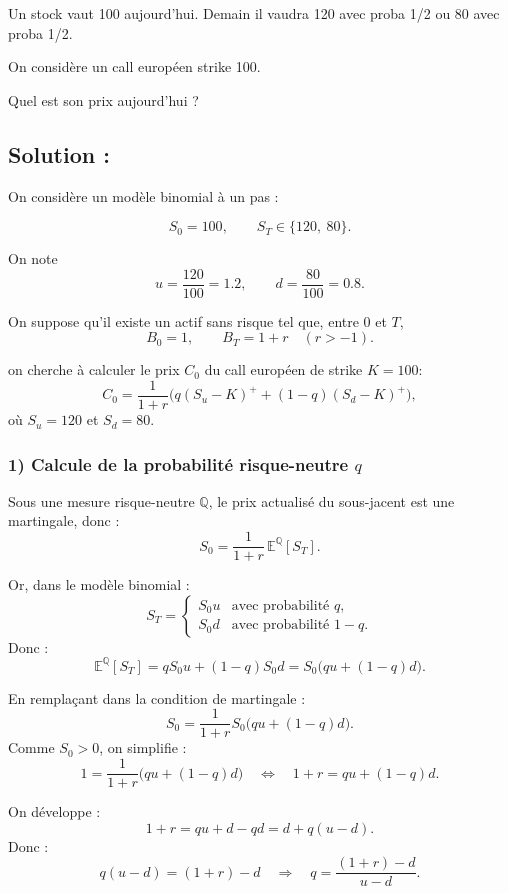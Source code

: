 \begin{exerciseBox}

Un stock vaut 100 aujourd’hui. Demain il vaudra 120 avec proba 1/2 ou 80 avec proba 1/2.

On considère un call européen strike 100.

Quel est son prix aujourd’hui ?
\end{exerciseBox}

\subsection*{Solution :}



On considère un modèle binomial à un pas :

\[
S_0 = 100,\qquad S_T\in\{120,\ 80\}.
\]

On note
\[
u=\frac{120}{100}=1.2,\qquad d=\frac{80}{100}=0.8.
\]

On suppose qu'il existe un actif sans risque tel que, entre $0$ et $T$,
\[
B_0=1,\qquad B_T=1+r \quad (r>-1).
\]


on cherche à calculer le prix $C_0$ du call européen de strike $K=100$:
\[
C_0=\frac{1}{1+r}\Big(q(S_u-K)^+ + (1-q)(S_d-K)^+\Big),
\]
où $S_u=120$ et $S_d=80$.

\subsubsection*{1) Calcule de la probabilité risque-neutre $q$}

Sous une mesure risque-neutre $\mathbb{Q}$, le prix actualisé du sous-jacent est une martingale, donc :
\[
S_0 = \frac{1}{1+r}\,\mathbb{E}^{\mathbb{Q}}[S_T].
\]

Or, dans le modèle binomial :
\[
S_T=
\begin{cases}
S_0u & \text{avec probabilité } q,\\
S_0d & \text{avec probabilité } 1-q.
\end{cases}
\]
Donc :
\[
\mathbb{E}^{\mathbb{Q}}[S_T]=qS_0u+(1-q)S_0d=S_0\big(qu+(1-q)d\big).
\]

En remplaçant dans la condition de martingale :
\[
S_0=\frac{1}{1+r}S_0\big(qu+(1-q)d\big).
\]
Comme $S_0>0$, on simplifie :
\[
1=\frac{1}{1+r}\big(qu+(1-q)d\big)
\quad\Longleftrightarrow\quad
1+r=qu+(1-q)d.
\]

On développe :
\[
1+r=qu+d-qd=d+q(u-d).
\]
Donc :
\[
q(u-d)= (1+r)-d
\quad\Longrightarrow\quad
\boxed{q=\frac{(1+r)-d}{u-d}}.
\]

